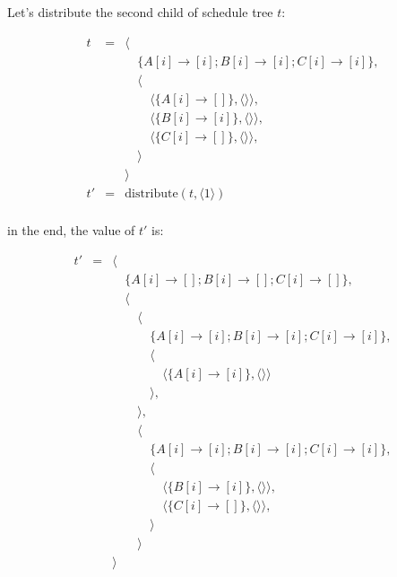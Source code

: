 \documentclass{article}
\begin{document}
Let's distribute the second child of schedule tree $t$:

\[
    \begin{array}{lcl}
        t &=& \langle \\
          & & \quad\{A[i] \rightarrow [i] ; B[i] \rightarrow [i] ; C[i] \rightarrow [i]\},\\
          & & \quad\langle \\
          & & \quad\quad \langle\{ A[i] \rightarrow [] \}, \langle\rangle\rangle,\\
          & & \quad\quad \langle\{ B[i] \rightarrow [i] \}, \langle\rangle\rangle,\\
          & & \quad\quad \langle\{ C[i] \rightarrow [] \}, \langle\rangle\rangle,\\
          & & \quad\rangle \\
          & & \rangle \\
        t'&=& \mathrm{distribute}(t, \langle 1 \rangle) \\
    \end{array}
\]

\noindent in the end, the value of $t'$ is:

\[
    \begin{array}{lcl}
        t'&=& \langle \\
          & & \quad\{A[i] \rightarrow [] ; B[i] \rightarrow [] ; C[i] \rightarrow [] \}, \\
          & & \quad\langle\\
          & & \quad\quad\langle \\
          & & \quad\quad\quad\{A[i] \rightarrow [i] ; B[i] \rightarrow [i] ; C[i] \rightarrow [i] \},\\
          & & \quad\quad\quad\langle \\
          & & \quad\quad\quad\quad \langle\{ A[i] \rightarrow [i] \}, \langle\rangle\rangle\\
          & & \quad\quad\quad\rangle, \\
          & & \quad\quad\rangle, \\
          & & \quad\quad\langle \\
          & & \quad\quad\quad\{A[i] \rightarrow [i] ; B[i] \rightarrow [i] ; C[i] \rightarrow [i]\},\\
          & & \quad\quad\quad\langle \\
          & & \quad\quad\quad\quad \langle\{ B[i] \rightarrow [i] \}, \langle\rangle\rangle,\\
          & & \quad\quad\quad\quad \langle\{ C[i] \rightarrow [] \}, \langle\rangle\rangle,\\
          & & \quad\quad\quad\rangle \\
          & & \quad\quad\rangle\\
          & & \rangle \\
    \end{array}
\]
\end{document}
